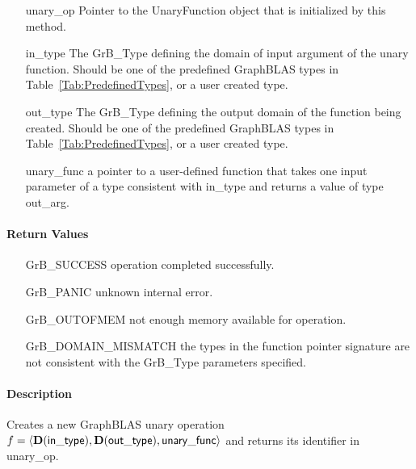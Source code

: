 \begin{itemize}[leftmargin=1.1in]
    \item[{\sf unary\_op}]      Pointer to the UnaryFunction object that is initialized by 
    this method.
    \item[{\sf in\_type}]        The {\sf GrB\_Type} defining the domain of input argument of
    the unary function. Should be one of the predefined
    GraphBLAS types in Table~\ref{Tab:PredefinedTypes}, or a user created type.
    \item[{\sf out\_type}]       The {\sf GrB\_Type} defining the output domain of the function
    being created.  Should be one of the predefined
    GraphBLAS types in Table~\ref{Tab:PredefinedTypes}, or a user created type.
    \item[{\sf unary\_func}]     a pointer to a user-defined function that takes one input 
    parameter of a type consistent with {\sf in\_type} and returns a value of type {\sf out\_arg}.
\end{itemize}


\paragraph{Return Values}

\begin{itemize}[leftmargin=2.1in]
\item[{\sf GrB\_SUCCESS}]           operation completed successfully.
\item[{\sf GrB\_PANIC}]             unknown internal error.
\item[{\sf GrB\_OUTOFMEM}]          not enough memory available for operation.
\item[{\sf GrB\_DOMAIN\_MISMATCH}]  the types in the function pointer signature are not   
                                    consistent with the {\sf GrB\_Type} parameters specified.
\end{itemize}

\paragraph{Description}

Creates a new GraphBLAS unary operation $f = \langle \bold{D}({\sf in\_type}), 
\bold{D}({\sf out\_type}), {\sf unary\_func} \rangle$ and returns its identifier 
in {\sf unary\_op}.




